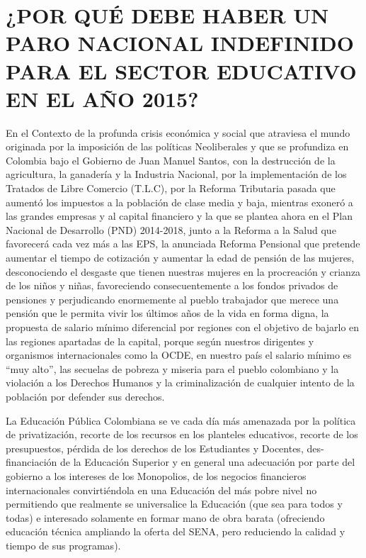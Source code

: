 \documentclass[10pt,twoside]{article}
\begin{document}
\section*{¿POR QUÉ DEBE HABER UN PARO NACIONAL INDEFINIDO PARA EL SECTOR EDUCATIVO EN EL AÑO 2015?}
En el Contexto de la profunda crisis económica y social que atraviesa el mundo originada por la imposición de las políticas Neoliberales y que se profundiza en Colombia  bajo el Gobierno de Juan Manuel Santos, con la destrucción de la agricultura, la ganadería y la Industria Nacional, por la implementación de los Tratados de Libre Comercio (T.L.C), por la Reforma Tributaria pasada que aumentó los impuestos a la población de clase media y baja, mientras exoneró a las grandes empresas y al capital financiero y la que se plantea ahora en el Plan Nacional de Desarrollo (PND) 2014-2018, junto a la Reforma a la Salud que favorecerá cada vez más a las EPS, la anunciada Reforma Pensional que pretende aumentar el tiempo de cotización y aumentar la edad de pensión de las mujeres, desconociendo el desgaste que tienen nuestras mujeres en la procreación y crianza de los niños y niñas, favoreciendo consecuentemente a los fondos privados de pensiones y perjudicando enormemente al pueblo trabajador que merece una pensión  que le permita vivir los últimos años de  la vida en forma digna, la propuesta de salario mínimo diferencial por regiones con el objetivo de bajarlo en las regiones apartadas de la capital, porque según nuestros dirigentes y organismos internacionales como la OCDE, en nuestro país el salario mínimo es “muy alto”, las secuelas de pobreza y miseria para el pueblo colombiano y la violación a los Derechos Humanos y la criminalización de cualquier intento de la población por  defender sus derechos.

La Educación Pública Colombiana se ve cada día más amenazada por la política de privatización, recorte de los recursos en los planteles educativos, recorte de los presupuestos, pérdida de los derechos de los Estudiantes y Docentes, des-financiación   de la Educación Superior y en general una adecuación por parte del gobierno a los intereses de los Monopolios, de los negocios financieros internacionales  convirtiéndola en una Educación del más pobre nivel no permitiendo que realmente se universalice la Educación (que sea para todos y todas) e interesado solamente en formar mano de obra barata (ofreciendo educación técnica ampliando la oferta del SENA, pero reduciendo la calidad y tiempo de sus programas).
\end{document}
